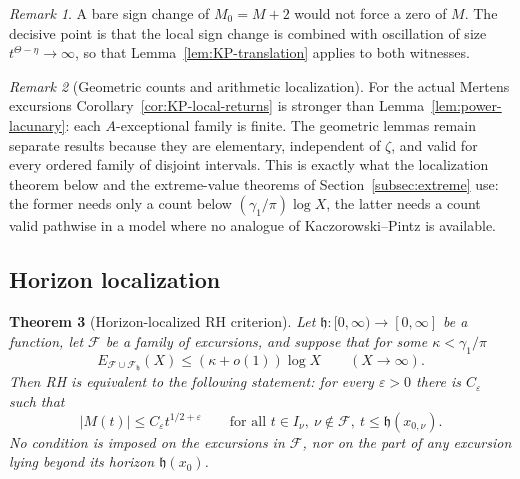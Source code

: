 \documentclass[11pt]{amsart}
\numberwithin{equation}{section}
\theoremstyle{plain}
\newtheorem{theorem}{Theorem}[section]
\theoremstyle{definition}
\theoremstyle{remark}
\newtheorem{remark}[theorem]{Remark}
\newcommand{\eps}{\varepsilon}
\newcommand{\F}{\mathcal{F}}
\begin{document}
\begin{remark}
A bare sign change of $M_0=M+2$ would not force a zero of $M$. The
decisive point is that the local sign change is combined with oscillation of
size $t^{\Theta-\eta}\to\infty$, so that Lemma~\ref{lem:KP-translation}
applies to both witnesses.
\end{remark}

\begin{remark}[Geometric counts and arithmetic localization]
\label{rem:geom-vs-arith}
For the actual Mertens excursions Corollary~\ref{cor:KP-local-returns} is
stronger than Lemma~\ref{lem:power-lacunary}: each $A$-exceptional family is
finite. The geometric lemmas remain separate results because they are
elementary, independent of $\zeta$, and valid for every ordered family of
disjoint intervals. This is exactly what the localization theorem below and
the extreme-value theorems of Section~\ref{subsec:extreme} use: the former
needs only a count below $(\gamma_1/\pi)\log X$, the latter needs a count
valid pathwise in a model where no analogue of Kaczorowski--Pintz is
available.
\end{remark}

\subsection{Horizon localization}
\label{subsec:horizon}

\begin{theorem}[Horizon-localized RH criterion]
\label{thm:horizon}
Let $\mathfrak h:[0,\infty)\to[0,\infty]$ be a function, let $\F$ be a family
of excursions, and suppose that for some $\kappa<\gamma_1/\pi$
\begin{equation}
\label{eq:horizon-hyp}
E_{\F\cup\F_{\mathfrak h}}(X)\le(\kappa+o(1))\log X\qquad(X\to\infty).
\end{equation}
Then RH is equivalent to the following statement: for every $\eps>0$ there
is $C_\eps$ such that
\begin{equation}
\label{eq:restricted-RH}
|M(t)|\le C_\eps t^{1/2+\eps}
\qquad\text{for all }t\in I_\nu,\ \nu\notin\F,\ t\le \mathfrak h(x_{0,\nu}).
\end{equation}
No condition is imposed on the excursions in $\F$, nor on the part of any
excursion lying beyond its horizon $\mathfrak h(x_0)$.
\end{theorem}
\end{document}

